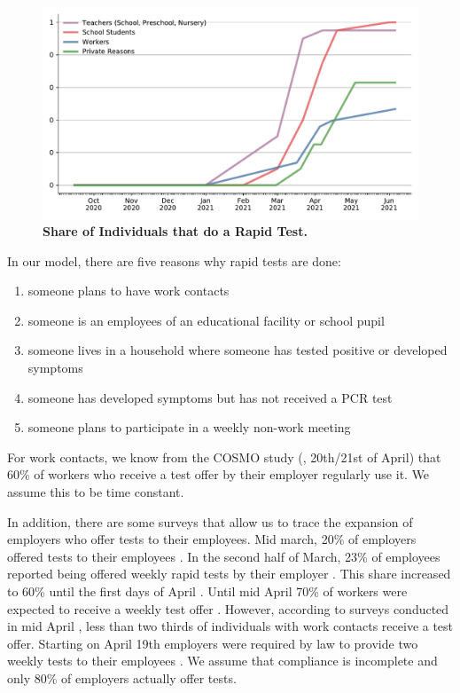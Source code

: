 \begin{figure}
    \centering
    \includegraphics[width=\textwidth]{../figures/results/figures/data/testing/rapid_test_demand_shares}
    \caption{\textbf{Share of Individuals that do a Rapid Test.} }
    \label{fig:rapid_test_demand}
\end{figure}

In our model, there are five reasons why rapid tests are done:
\begin{enumerate}
    \item someone plans to have work contacts
    \item someone is an employees of an educational facility or school pupil
    \item someone lives in a household where someone has tested positive or developed
          symptoms
    \item someone has developed symptoms but has not received a PCR test
    \item someone plans to participate in a weekly non-work meeting
\end{enumerate}


For work contacts, we know from the COSMO study (\cite{Betsch2021}, 20th/21st of April)
that 60\% of workers who receive a test offer by their employer regularly use it. We
assume this to be time constant.

In addition, there are some surveys that allow us to trace the expansion of employers
who offer tests to their employees. Mid march, 20\% of employers offered tests to their
employees \citep{DIHK2021}. In the second half of March, 23\% of employees reported
being offered weekly rapid tests by their employer \citep{Ahlers2021}. This share
increased to 60\% until the first days of April \cite{ZDF2021}. Until mid April 70\% of
workers were expected to receive a weekly test offer \citep{AerzteZeitung2021}. However,
according to surveys conducted in mid April \citep{Betsch2021}, less than two thirds of
individuals with work contacts receive a test offer. Starting on April 19th employers
were required by law to provide two weekly tests to their employees
\citep{Bundesanzeiger2021}. We assume that compliance is incomplete and only 80\% of
employers actually offer tests.

